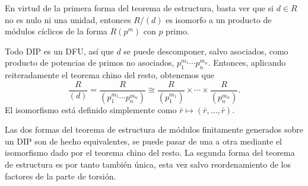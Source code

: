 
En virtud de la primera forma del teorema de estructura, basta ver que
si \(d\in R\) no es nulo ni una unidad, entonces \(R/(d)\) es isomorfo a
un producto de módulos cíclicos de la forma \(R(p^m)\) con \(p\) primo.

Todo DIP es un DFU, así que \(d\) se puede descomponer, salvo asociados,
como producto de potencias de primos no asociados,
\(p_{1}^{m_1}\cdots p_{n}^{m_n}\). Entonces, aplicando
reiteradamente el teorema chino del resto, obtenemos que
\[\frac{R}{(d)}=\frac{R}{(p_{1}^{m_1}\cdots p_{n}^{m_n})}\cong \frac{R}{(p_{1}^{m_1})}\times\cdots\times \frac{R}{(p_{n}^{m_n})}.\]
El isomorfismo está definido simplemente como
\(\bar r\mapsto (\bar r,\dots,\bar r)\).\\

Las dos formas del teorema de estructura de módulos finitamente
generados sobre un DIP son de hecho equivalentes, se puede pasar de una
a otra mediante el isomorfismo dado por el teorema chino del resto. La
segunda forma del teorema de estructura es por tanto también única, esta
vez salvo reordenamiento de los factores de la parte de torsión.

